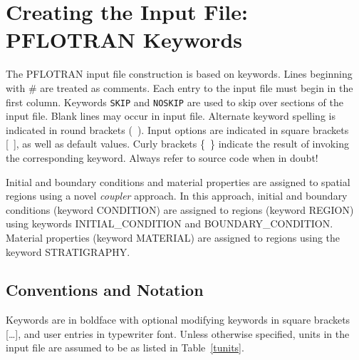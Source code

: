 \section{Creating the Input File: PFLOTRAN Keywords}

\setcounter{equation}{0}

The PFLOTRAN input file construction is based on keywords. Lines beginning with \# are treated as comments. Each entry to the input file must begin in the first column. Keywords {\tt SKIP} and {\tt NOSKIP} are used to skip over sections of the input file. Blank lines may occur in input file. Alternate keyword spelling is indicated in round brackets (~). Input options are indicated in square brackets [~], as well as default values. Curly brackets \{~\} indicate the result of invoking the corresponding keyword. Always refer to source code when in doubt!

Initial and boundary conditions and material properties are assigned to spatial regions using a novel {\em coupler} approach. In this approach, initial and boundary conditions (keyword CONDITION) are assigned to regions (keyword REGION) using keywords INITIAL\_CONDITION and BOUNDARY\_CONDITION. Material properties (keyword MATERIAL) are assigned to regions using the keyword STRATIGRAPHY.

\subsection{Conventions and Notation} 

Keywords are in boldface with optional modifying keywords in square brackets [\ldots], and user entries in typewriter font.
Unless otherwise specified, units in the input file are assumed to be as listed in Table~\ref{tunits}.

